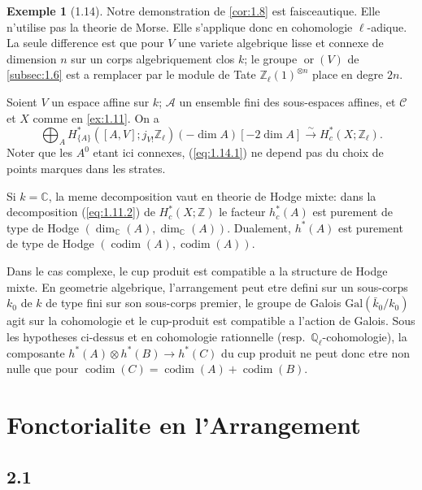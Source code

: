 \documentclass[11pt,a4paper]{article}
\theoremstyle{plain}
\theoremstyle{definition}
\newtheorem{example}[theorem]{Exemple}
\DeclareMathOperator{\codim}{codim}
\newcommand{\ori}{\operatorname{or}}
\begin{document}
\begin{example}[1.14]\label{ex:1.14}
Notre demonstration de \ref{cor:1.8} est faisceautique. Elle n'utilise pas la theorie de Morse. Elle s'applique donc en cohomologie $\ell$-adique. La seule difference est que pour $V$ une variete algebrique lisse et connexe de dimension $n$ sur un corps algebriquement clos $k$; le groupe $\ori(V)$ de \ref{subsec:1.6} est a remplacer par le module de Tate $\mathbb{Z}_\ell(1)^{\otimes n}$ place en degre $2n$.

Soient $V$ un espace affine sur $k$; $\mathcal{A}$ un ensemble fini des sous-espaces affines, et $\mathcal{C}$ et $X$ comme en \ref{ex:1.11}. On a
\begin{equation}\label{eq:1.14.1}
\bigoplus_A H^*_{\{A\}}([A,V];j_{V!}\mathbb{Z}_\ell)(-\dim A)[-2\dim A] \xrightarrow{\sim} H^*_c(X;\mathbb{Z}_\ell).
\tag{1.14.1}
\end{equation}
Noter que les $A^0$ etant ici connexes, (\ref{eq:1.14.1}) ne depend pas du choix de points marques dans les strates.

Si $k = \mathbb{C}$, la meme decomposition vaut en theorie de Hodge mixte: dans la decomposition (\ref{eq:1.11.2}) de $H^*_c(X;\mathbb{Z})$ le facteur $h^*_c(A)$ est purement de type de Hodge $(\dim_{\mathbb{C}}(A), \dim_{\mathbb{C}}(A))$. Dualement, $h^*(A)$ est purement de type de Hodge $(\codim(A), \codim(A))$.

Dans le cas complexe, le cup produit est compatible a la structure de Hodge mixte. En geometrie algebrique, l'arrangement peut etre defini sur un sous-corps $k_0$ de $k$ de type fini sur son sous-corps premier, le groupe de Galois $\mathrm{Gal}(\bar{k}_0/k_0)$ agit sur la cohomologie et le cup-produit est compatible a l'action de Galois. Sous les hypotheses ci-dessus et en cohomologie rationnelle (resp.~$\mathbb{Q}_\ell$-cohomologie), la composante $h^*(A) \otimes h^*(B) \to h^*(C)$ du cup produit ne peut donc etre non nulle que pour $\codim(C) = \codim(A) + \codim(B)$.
\end{example}


\section{Fonctorialite en l'Arrangement}\label{sec:2}

\subsection{2.1}\label{subsec:2.1}
\end{document}
